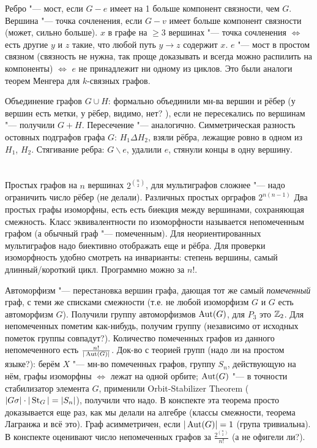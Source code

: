 Ребро "--- мост, если $G-e$ имеет на 1 больше компонент связности, чем $G$.
Вершина "--- точка сочленения, если $G-v$ имеет больше компонент связности (может, сильно больше).
$x$ в графе на $\ge 3$ вершинах "--- точка сочленения $\iff$ есть другие $y$ и $z$ такие, что любой путь $y\to z$ содержит $x$.
$e$ "--- мост в простом связном (связность не нужна, так проще доказывать и всегда можно распилить на компоненты) $\iff$ $e$ не принадлежит ни одному из циклов.
Это были аналоги теорем Менгера для $k$-связных графов.

Объединение графов $G\cup H$: формально объединили мн-ва вершин и рёбер (у вершин есть метки, у рёбер, видимо, нет? \TODO), если не пересекались по вершинам "--- получили $G+H$.
Пересечение "--- аналогично.
Симметрическая разность остовных подграфов графа $G$: $H_1 \Delta H_2$, взяли рёбра, лежащие ровно в одном из $H_1$, $H_2$.
Стягивание ребра: $G \backslash e$, удалили $e$, стянули концы в одну вершину.

\section{} %
Простых графов на $n$ вершинах $2^{\binom{n}{2}}$, для мультиграфов сложнее "--- надо ограничить число рёбер (не делали).
Различных простых орграфов $2^{n(n-1)}$
Два простых графы изоморфны, есть есть биекция между вершинами, сохраняющая смежность.
Класс эквивалентности по изоморфности называется непомеченным графом (а обычный граф "--- помеченным).
Для неориентированных мультиграфов надо биективно отображать еще и рёбра.
Для проверки изоморфность удобно смотреть на инварианты: степень вершины, самый длинный/короткий цикл.
Программно можно за $n!$.

Автоморфизм "--- перестановка вершин графа, дающая тот же самый \textit{помеченный} граф, с теми же списками смежности (т.е. не любой изоморфизм $G$ и $G$ есть автоморфизм $G$).
Получили группу автоморфизмов $\operatorname{Aut}(G)$, для $P_3$ это $\mathbb{Z}_2$.
Для непомеченных пометим как-нибудь, получим группу (\TODO независимо от исходных пометок группы совпадут?).
Количество помеченных графов из данного непомеченного есть $\frac{n!}{|\operatorname{Aut}(G)|}$.
Док-во с теорией групп (\TODO надо ли на простом языке?): берём $X$ "--- мн-во помеченных графов, группу $S_n$, действующую на нём, графы изоморфны $\iff$ лежат на одной орбите;
$\operatorname{Aut}(G)$ "--- в точности стабилизатор элемента $G$, применили Orbit-Stabilizer Theorem ($|G\sigma| \cdot |\operatorname{St}_G| = |S_n|$), получили что надо.
В конспекте эта теорема просто доказывается еще раз, как мы делали на алгебре (классы смежности, теорема Лагранжа и всё это).
Граф асимметричен, если $|\operatorname{Aut}(G)|=1$ (група тривиальна).
В конспекте оценивают число непомеченных графов за $\frac{2^{\binom{n}{2}}}{n!}$ (\TODO а не офигели ли?).
